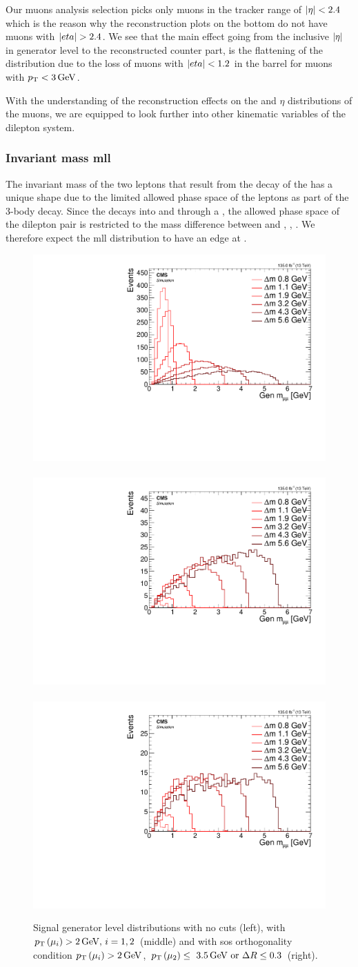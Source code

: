 Our muons analysis selection picks only muons in the tracker range of $\lvert \eta \rvert<2.4$ which is the reason why the reconstruction plots on the bottom do not have muons with $\lvert eta \rvert>2.4$. We see that the main effect going from the inclusive $\lvert \eta \rvert$ in generator level to the reconstructed counter part, is the flattening of the distribution due to the loss of muons with $\lvert eta \rvert<1.2$ in the barrel for muons with $p_{\mathrm{T}}<3\,\text{Ge\hspace{-.08em}V}$.

With the understanding of the reconstruction effects on the \pt and $\eta$ distributions of the muons, we are equipped to look further into other kinematic variables of the dilepton system.

\subsubsection{Invariant mass \gls{mll}}
\label{sec:gen-invariant-mass}

The invariant mass of the two leptons that result from the decay of the \neutt has a unique shape due to the limited allowed phase space of the leptons as part of the 3-body decay. Since the \neutt decays into \neuto and \ellell through a \PZstar, the allowed phase space of the dilepton pair is restricted to the mass difference between \neutt and \neuto, \ie, \dm. We therefore expect the \gls{mll} distribution to have an edge at \dm.

\begin{figure}[!htb]
\centering
\includegraphics[width=0.32\linewidth]{plots/signal_muons_gen/none_gen_invMass.pdf} \,
\includegraphics[width=0.32\linewidth]{plots/signal_muons_gen/none_gen_invMass_cut.pdf}  \,
\includegraphics[width=0.32\linewidth]{plots/signal_muons_gen/none_gen_invMass_orth.pdf} \\
\caption[Signal generator level \mll distributions]{ Signal generator level \mll distributions with no cuts (left), with $p_{\mathrm{T}}\left(\mu_i\right)>2\,\text{Ge\hspace{-.08em}V},\,i=1,2$ (middle) and with \gls{sos} orthogonality condition $p_{\mathrm{T}}\left(\mu_i\right)>2\,\text{Ge\hspace{-.08em}V}$, $p_{\mathrm{T}}\left(\mu_2\right)\leq~3.5\,\text{Ge\hspace{-.08em}V}\text{ or }\Delta R\leq 0.3$ (right).}
\label{fig:signal-generator-mll}
\end{figure}

